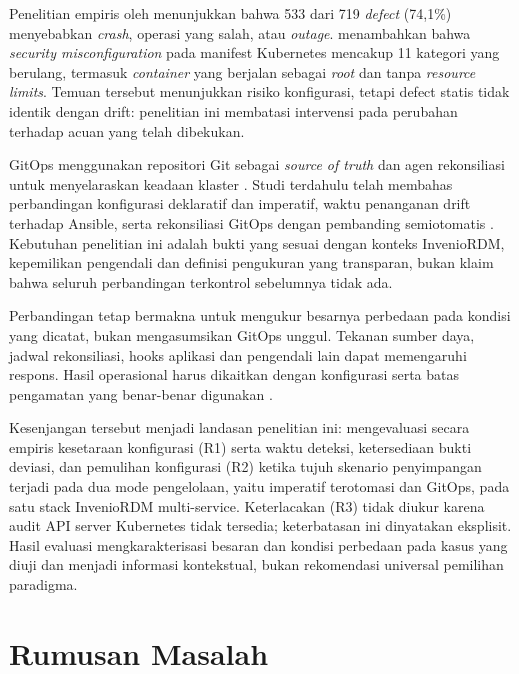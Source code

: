 Penelitian empiris oleh \citet{zhang2026configuration} menunjukkan bahwa 533 dari 719 \textit{defect} (74,1\%) menyebabkan \textit{crash}, operasi yang salah, atau \textit{outage}. \citet{rahman2023security} menambahkan bahwa \textit{security misconfiguration} pada manifest Kubernetes mencakup 11 kategori yang berulang, termasuk \textit{container} yang berjalan sebagai \textit{root} dan tanpa \textit{resource limits}. Temuan tersebut menunjukkan risiko konfigurasi, tetapi defect statis tidak identik dengan drift: penelitian ini membatasi intervensi pada perubahan terhadap acuan yang telah dibekukan.

GitOps menggunakan repositori Git sebagai \textit{source of truth} dan agen rekonsiliasi untuk menyelaraskan keadaan klaster \citep{opengitops2021}. Studi terdahulu telah membahas perbandingan konfigurasi deklaratif dan imperatif, waktu penanganan drift terhadap Ansible, serta rekonsiliasi GitOps dengan pembanding semiotomatis \citep{kaggantinataraja2025security,shrestha2024configuration,matubber2025managing}. Kebutuhan penelitian ini adalah bukti yang sesuai dengan konteks InvenioRDM, kepemilikan pengendali dan definisi pengukuran yang transparan, bukan klaim bahwa seluruh perbandingan terkontrol sebelumnya tidak ada.

Perbandingan tetap bermakna untuk mengukur besarnya perbedaan pada kondisi yang dicatat, bukan mengasumsikan GitOps unggul. Tekanan sumber daya, jadwal rekonsiliasi, hooks aplikasi dan pengendali lain dapat memengaruhi respons. Hasil operasional harus dikaitkan dengan konfigurasi serta batas pengamatan yang benar-benar digunakan \citep{forsgren2018accelerate}.

Kesenjangan tersebut menjadi landasan penelitian ini: mengevaluasi secara empiris kesetaraan konfigurasi (R1) serta waktu deteksi, ketersediaan bukti deviasi, dan pemulihan konfigurasi (R2) ketika tujuh skenario penyimpangan terjadi pada dua mode pengelolaan, yaitu imperatif terotomasi dan GitOps, pada satu stack InvenioRDM multi-service. Keterlacakan (R3) tidak diukur karena audit API server Kubernetes tidak tersedia; keterbatasan ini dinyatakan eksplisit. Hasil evaluasi mengkarakterisasi besaran dan kondisi perbedaan pada kasus yang diuji dan menjadi informasi kontekstual, bukan rekomendasi universal pemilihan paradigma.

\section{Rumusan Masalah}

